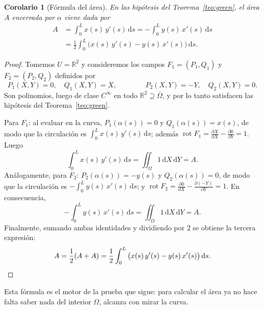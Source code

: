 \documentclass[12pt,a4paper]{article}
\theoremstyle{profesional}
\newtheorem{corolario}[teorema]{Corolario}
\theoremstyle{definicion-style}
\newcommand{\R}{\mathbb{R}}
\begin{document}
\begin{corolario}[Fórmula del área]\label{cor:area}
    En las hipótesis del Teorema~\ref{teo:green}, el área \( A \) encerrada por \( \alpha \) viene dada por
    \begin{align*}
        A & = \int_0^L x(s) \, y'(s) \, \mathrm{d}s = -\int_0^L y(s) \, x'(s) \, \mathrm{d}s \\ & = \frac{1}{2} \int_0^L \big( x(s) \, y'(s) - y(s) \, x'(s) \big) \, \mathrm{d}s.
    \end{align*}
\end{corolario}
\begin{proof}
    Tomemos \( U = \R^2 \) y consideremos los campos \( F_1 = (P_1, Q_1) \) y \( F_2 = (P_2, Q_2) \) definidos por
    \[
        P_1(X, Y) = 0, \quad Q_1(X, Y) = X, \qquad\qquad P_2(X, Y) = -Y, \quad Q_2(X, Y) = 0.
    \]
    Son polinomios, luego de clase \( C^\infty \) en todo \( \R^2 \supseteq \overline{\Omega} \), y por lo tanto satisfacen las hipótesis del Teorema~\ref{teo:green}.

    Para \( F_1 \): al evaluar en la curva, \( P_1(\alpha(s)) = 0 \) y \( Q_1(\alpha(s)) = x(s) \), de modo que la circulación es \( \int_0^L x(s) \, y'(s) \, \mathrm{d}s \); además
    \( \operatorname{rot} F_1 = \frac{\partial X}{\partial X} - \frac{\partial 0}{\partial Y} = 1 \). Luego
    \[
        \int_0^L x(s) \, y'(s) \, \mathrm{d}s = \iint_{\Omega} 1 \, \mathrm{d}X \, \mathrm{d}Y = A.
    \]
    Análogamente, para \( F_2 \): \( P_2(\alpha(s)) = -y(s) \) y \( Q_2(\alpha(s)) = 0 \), de modo que la circulación es \( -\int_0^L y(s) \, x'(s) \, \mathrm{d}s \); y
    \( \operatorname{rot} F_2 = \frac{\partial 0}{\partial X} - \frac{\partial (-Y)}{\partial Y} = 1 \). En consecuencia,
    \[
        -\int_0^L y(s) \, x'(s) \, \mathrm{d}s = \iint_{\Omega} 1 \, \mathrm{d}X \, \mathrm{d}Y = A.
    \]
    Finalmente, sumando ambas identidades y dividiendo por \( 2 \) se obtiene la tercera expresión:
    \[
        A = \frac{1}{2}(A + A) = \frac{1}{2} \int_0^L \big( x(s) \, y'(s) - y(s) \, x'(s) \big) \, \mathrm{d}s. \qedhere
    \]
\end{proof}

Esta fórmula es el motor de la prueba que sigue: para calcular el área ya no hace falta saber nada del interior \( \Omega \), alcanza con mirar la curva.
\end{document}
